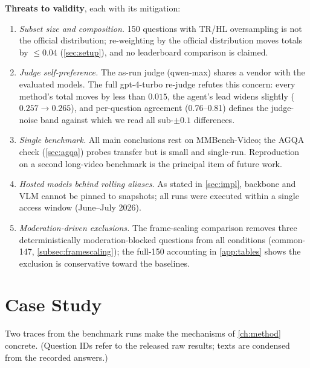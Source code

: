 \textbf{Threats to validity}, each with its mitigation:
\begin{enumerate}
  \item \emph{Subset size and composition.} 150 questions with TR/HL oversampling
  is not the official distribution; re-weighting by the official distribution
  moves totals by $\leq 0.04$ (\cref{sec:setup}), and no leaderboard comparison is
  claimed.
  \item \emph{Judge self-preference.} The as-run judge (qwen-max) shares a vendor
  with the evaluated models. The full gpt-4-turbo re-judge refutes this concern:
  every method's total moves by less than $0.015$, the agent's lead widens
  slightly ($0.257 \to 0.265$), and per-question agreement (0.76--0.81) defines
  the judge-noise band against which we read all sub-$\pm 0.1$ differences.
  \item \emph{Single benchmark.} All main conclusions rest on MMBench-Video; the
  AGQA check (\cref{sec:agqa}) probes transfer but is small and single-run.
  Reproduction on a second long-video benchmark is the principal item of future
  work.
  \item \emph{Hosted models behind rolling aliases.} As stated in
  \cref{sec:impl}, backbone and VLM cannot be pinned to snapshots; all runs
  were executed within a single access window (June--July 2026).
  \item \emph{Moderation-driven exclusions.} The frame-scaling comparison removes
  three deterministically moderation-blocked questions from all conditions
  (common-147, \cref{subsec:framescaling}); the full-150 accounting in
  \cref{app:tables} shows the exclusion is conservative toward the baselines.
\end{enumerate}

\section{Case Study}
\label{sec:case}

Two traces from the benchmark runs make the mechanisms of \cref{ch:method}
concrete. (Question IDs refer to the released raw results; texts are condensed
from the recorded answers.)

